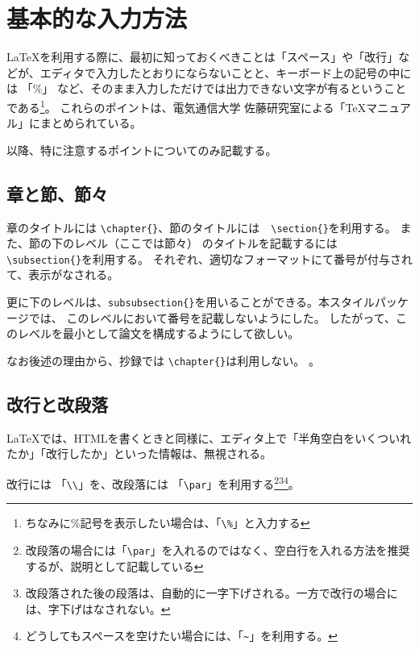 \documentclass[a4paper,10pt,twocolumn]{jsarticle}
\begin{document}
\section{基本的な入力方法}
\LaTeX を利用する際に、最初に知っておくべきことは「スペース」や「改行」などが、エディタで入力したとおりにならないことと、キーボード上の記号の中には 「\%」 など、そのまま入力しただけでは出力できない文字が有るということである\footnote{ちなみに\%記号を表示したい場合は、「\verb+\%+」と入力する}。
これらのポイントは、電気通信大学 佐藤研究室による「TeXマニュアル」\cite{HTUlatex}にまとめられている。

以降、特に注意するポイントについてのみ記載する。
\subsection{章と節、節々}
章のタイトルには \verb+\chapter{}+、節のタイトルには　\verb+\section{}+を利用する。
また、節の下のレベル（ここでは節々） のタイトルを記載するには \verb+\subsection{}+を利用する。
それぞれ、適切なフォーマットにて番号が付与されて、表示がなされる。

更に下のレベルは、\verb+subsubsection{}+を用いることができる。本スタイルパッケージでは、
このレベルにおいて番号を記載しないようにした。
したがって、このレベルを最小として論文を構成するようにして欲しい。

なお後述の理由から、抄録では \verb+\chapter{}+は利用しない。
。

\subsection{改行と改段落}
\LaTeX では、HTMLを書くときと同様に、エディタ上で「半角空白をいくついれたか」「改行したか」といった情報は、無視される。

改行には 「\verb+\\+」を、改段落には 「\verb+\par+」を利用する\footnote{改段落の場合には「\verb+\par+」を入れるのではなく、空白行を入れる方法を推奨するが、説明として記載している}\footnote{改段落された後の段落は、自動的に一字下げされる。一方で改行の場合には、字下げはなされない。}\footnote{どうしてもスペースを空けたい場合には、「\verb+~+」を利用する。}。
\end{document}
